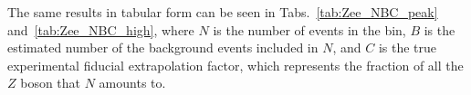 \begin{figure}
\end{figure}

The same results in tabular form can be seen in Tabs.~\ref{tab:Zee_NBC_peak} and~\ref{tab:Zee_NBC_high}, where $N$ is the number of events in the bin, $B$ is the estimated number of the background events included in $N$, and $C$ is the true experimental fiducial extrapolation factor, which represents the fraction of all the $Z$ boson that $N$ amounts to.

